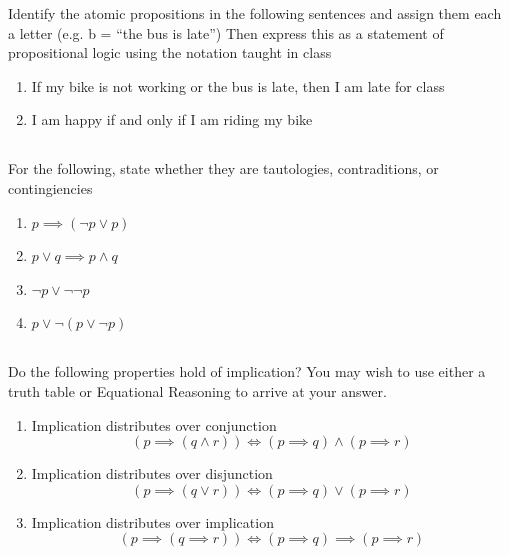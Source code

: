 \documentclass[twocolumn]{article}
\newcommand\mrk[1]{}
\begin{document}
Identify the atomic propositions in the following sentences and assign them each a letter (e.g. b = ``the bus is late'') Then express this as a statement of propositional logic using the notation taught in class

\begin{enumerate}
    \item If my bike is not working or the bus is late, then I am late for class \mrk{2}
    \item I am happy if and only if I am riding my bike \mrk{2}
\end{enumerate}

\subsection{}

For the following, state whether they are tautologies, contraditions, or contingiencies

\begin{enumerate}
    \item $p \implies (\neg p \vee p)$ \mrk{1}
    \item $p \vee q \implies p \wedge q$ \mrk{1}
    \item $\neg p \vee \neg\neg p$ \mrk{1}
    \item $p \vee \neg (p \vee \neg p) $ \mrk{1}
\end{enumerate}


\subsection{}

Do the following properties hold of implication? You may wish to use either a truth table or Equational Reasoning to arrive at your answer.

\begin{enumerate}
    \item Implication distributes over conjunction $$ (p \implies (q \wedge r)) \Longleftrightarrow (p \implies q) \wedge (p \implies r) $$ \mrk{1}
    \item Implication distributes over disjunction $$ (p \implies (q \vee r)) \Longleftrightarrow (p \implies q) \vee (p \implies r) $$ \mrk{1}
    \item Implication distributes over implication $$ (p \implies (q \implies r)) \Leftrightarrow (p \implies q) \implies (p \implies r) $$ \mrk{1}
\end{enumerate}
\end{document}
